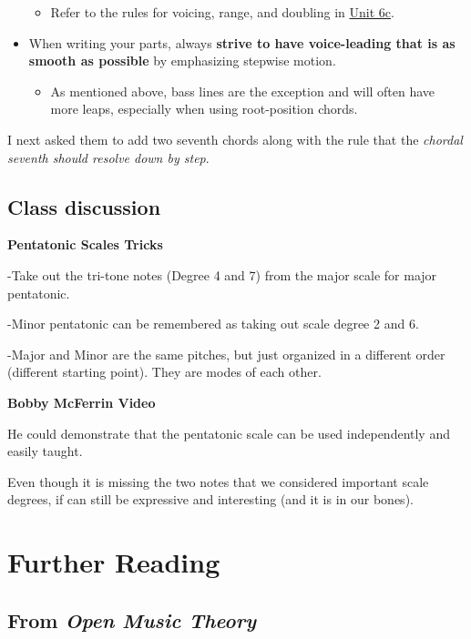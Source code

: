 \documentclass{book}
\providecommand{\tightlist}{%
  \setlength{\itemsep}{0pt}\setlength{\parskip}{0pt}}
\begin{document}
\begin{itemize}
  \begin{itemize}
  \tightlist
  \item
    Refer to the rules for voicing, range, and doubling in
    \href{06-intro-harmonic/c1-voiceleadingerrors.html}{Unit 6c}.
  \end{itemize}
\item
  When writing your parts, always \textbf{strive to have voice-leading that is
  as smooth as possible} by emphasizing stepwise motion.

  \begin{itemize}
  \tightlist
  \item
    As mentioned above, bass lines are the exception and will often have more
    leaps, especially when using root-position chords.
  \end{itemize}
\end{itemize}

I next asked them to add two seventh chords along with the rule that the
\emph{chordal seventh should resolve down by step}.

\hypertarget{class-discussion-26}{%
\section{Class discussion}\label{class-discussion-26}}

\textbf{Pentatonic Scales Tricks}

-Take out the tri-tone notes (Degree 4 and 7) from the major scale for major
pentatonic.

-Minor pentatonic can be remembered as taking out scale degree 2 and 6.

-Major and Minor are the same pitches, but just organized in a different order
(different starting point). They are modes of each other.

\textbf{Bobby McFerrin Video}

He could demonstrate that the pentatonic scale can be used independently and
easily taught.

Even though it is missing the two notes that we considered important scale
degrees, if can still be expressive and interesting (and it is in our bones).

\hypertarget{further-reading-14}{%
\chapter{Further Reading}\label{further-reading-14}}

\hypertarget{from-open-music-theory-14}{%
\section{\texorpdfstring{From \emph{Open Music
Theory}}{From Open Music Theory}}\label{from-open-music-theory-14}}
\end{document}
